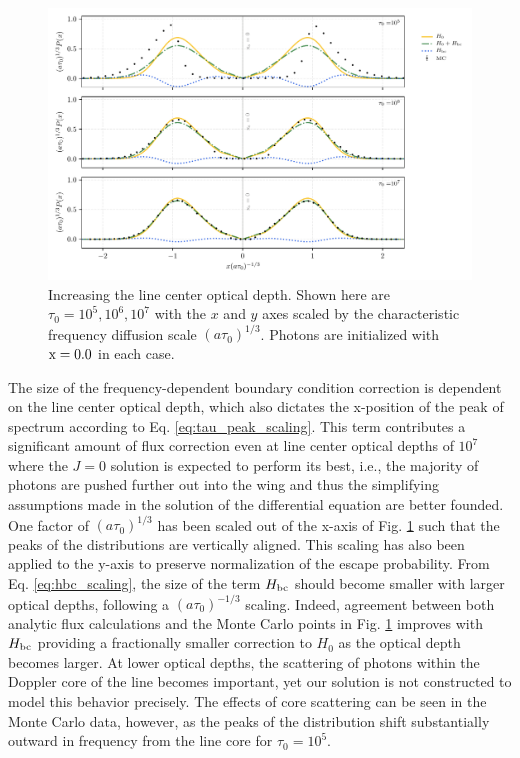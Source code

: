 \documentclass{aastex63}
\begin{document}
 \begin{figure}
    \centering
    \includegraphics{tau_threepanel.pdf}
    \caption{Increasing the line center optical depth. Shown here are $\tau_0 = 10^5, 10^6, 10^7$ with the $x$ and $y$ axes scaled by the characteristic frequency diffusion scale $(a\tau_0)^{1/3}$. Photons are initialized with $\rm x = 0.0$ in each case.} 
    \label{fig:sol_mc_tau}
\end{figure}

The size of the frequency-dependent boundary condition correction is dependent on the line center optical depth, which also dictates the x-position of the peak of spectrum according to Eq. \ref{eq:tau_peak_scaling}. This term contributes a significant amount of flux correction even at line center optical depths of $10^7$ where the $J=0$ solution is expected to perform its best, i.e., the majority of photons are pushed further out into the wing and thus the simplifying assumptions made in the solution of the differential equation are better founded. One factor of $(a\tau_0)^{1/3}$ has been scaled out of the x-axis of Fig. \ref{fig:sol_mc_tau} such that the peaks of the distributions are vertically aligned. This scaling has also been applied to the y-axis to preserve normalization of the escape probability. From Eq. \ref{eq:hbc_scaling}, the size of the term $H_{\rm bc}$ should become smaller with larger optical depths, following a $(a\tau_0)^{-1/3}$ scaling. Indeed, agreement between both analytic flux calculations and the Monte Carlo points in Fig. \ref{fig:sol_mc_tau} improves with $H_{\rm bc}$ providing a fractionally smaller correction to $H_0$ as the optical depth becomes larger. At lower optical depths, the scattering of photons within the Doppler core of the line becomes important, yet our solution is not constructed to model this behavior precisely. The effects of core scattering can be seen in the Monte Carlo data, however, as the peaks of the distribution shift substantially outward in frequency from the line core for $\tau_0 = 10^5$.
 
\end{document}
